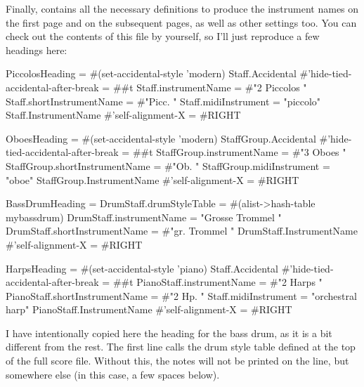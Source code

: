 \documentclass[../../LilyPond-Tutorials]{subfiles}
\begin{document}
Finally,  contains all the necessary definitions to produce the instrument names on the first page and on the subsequent pages, as well as other settings too.
You can check out the contents of this file by yourself, so I'll just reproduce a few headings here:

\begin{lilypondcode}
PiccolosHeading = {
       #(set-accidental-style 'modern)
       \override Staff.Accidental #'hide-tied-accidental-after-break = ##t
       \set Staff.instrumentName = #"2 Piccolos "
       \set Staff.shortInstrumentName = #"Picc. "
       \set Staff.midiInstrument = "piccolo"
       \override Staff.InstrumentName #'self-alignment-X = #RIGHT
}

OboesHeading = {
       #(set-accidental-style 'modern)
       \override StaffGroup.Accidental #'hide-tied-accidental-after-break = ##t
       \set StaffGroup.instrumentName = #"3 Oboes "
       \set StaffGroup.shortInstrumentName = #"Ob. "
       \set StaffGroup.midiInstrument = "oboe"
       \override StaffGroup.InstrumentName #'self-alignment-X = #RIGHT
}

BassDrumHeading = {
       \set DrumStaff.drumStyleTable = #(alist->hash-table mybassdrum)
       \set DrumStaff.instrumentName = "Grosse Trommel "
       \set DrumStaff.shortInstrumentName = #"gr. Trommel "
       \override DrumStaff.InstrumentName #'self-alignment-X = #RIGHT
}

HarpsHeading = {
       #(set-accidental-style 'piano)
       \override Staff.Accidental #'hide-tied-accidental-after-break = ##t
       \set PianoStaff.instrumentName = #"2 Harps "
       \set PianoStaff.shortInstrumentName = #"2 Hp. "
       \set Staff.midiInstrument = "orchestral harp"
       \override PianoStaff.InstrumentName #'self-alignment-X = #RIGHT
}\end{lilypondcode}


I have intentionally copied here the heading for the bass drum, as it is a bit different from the rest.
The first line calls the drum style table defined at the top of the full score file.
Without this, the notes will not be printed on the line, but somewhere else (in this case, a few spaces below).
\end{document}
